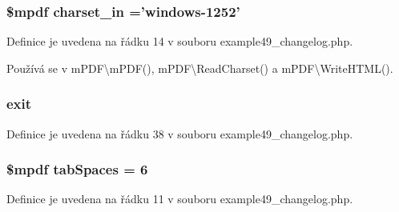 \hypertarget{example49__changelog_8php_a2ee5c294694d309db57ff7d247030461}{
\subsubsection[{charset\-\_\-in}]{\setlength{\rightskip}{0pt plus 5cm}\$mpdf charset\-\_\-in ='windows-\/1252'}}\label{example49__changelog_8php_a2ee5c294694d309db57ff7d247030461}


Definice je uvedena na řádku 14 v souboru example49\-\_\-changelog.\-php.



Používá se v m\-P\-D\-F\textbackslash{}m\-P\-D\-F(), m\-P\-D\-F\textbackslash{}\-Read\-Charset() a m\-P\-D\-F\textbackslash{}\-Write\-H\-T\-M\-L().

\hypertarget{example49__changelog_8php_a6733eb5f605d09eaede9845835d71c4e}{
\subsubsection[{exit}]{\setlength{\rightskip}{0pt plus 5cm}exit}}\label{example49__changelog_8php_a6733eb5f605d09eaede9845835d71c4e}


Definice je uvedena na řádku 38 v souboru example49\-\_\-changelog.\-php.

\hypertarget{example49__changelog_8php_ab4e4c4f5a4a02d8b15368b16f6a0d60c}{
\subsubsection[{tab\-Spaces}]{\setlength{\rightskip}{0pt plus 5cm}\$mpdf tab\-Spaces = 6}}\label{example49__changelog_8php_ab4e4c4f5a4a02d8b15368b16f6a0d60c}


Definice je uvedena na řádku 11 v souboru example49\-\_\-changelog.\-php.


